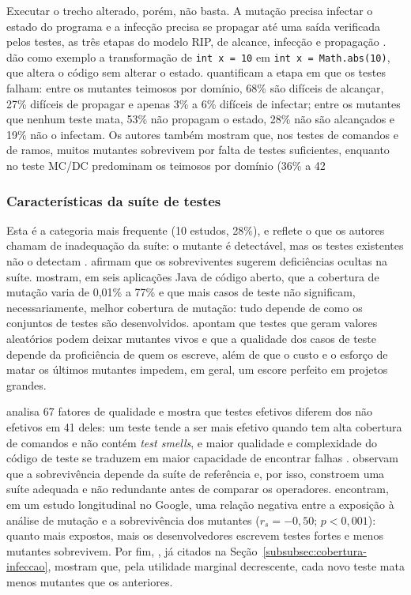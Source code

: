 Executar o trecho alterado, porém, não basta. A mutação precisa infectar o estado do programa e a infecção precisa se propagar até uma saída verificada pelos testes, as três etapas do modelo RIP, de alcance, infecção e propagação \cite{yao2014, lin2018}.  dão como exemplo a transformação de \texttt{int x = 10} em \texttt{int x = Math.abs(10)}, que altera o código sem alterar o estado.  quantificam a etapa em que os testes falham: entre os mutantes teimosos por domínio, 68\% são difíceis de alcançar, 27\% difíceis de propagar e apenas 3\% a 6\% difíceis de infectar; entre os mutantes que nenhum teste mata, 53\% não propagam o estado, 28\% não são alcançados e 19\% não o infectam. Os autores também mostram que, nos testes de comandos e de ramos, muitos mutantes sobrevivem por falta de testes suficientes, enquanto no teste MC/DC predominam os teimosos por domínio (36\% a 42%

\subsubsection{Características da suíte de testes}
\label{subsubsec:caracteristicas-suite}

Esta é a categoria mais frequente (10 estudos, 28\%), e reflete o que os autores chamam de inadequação da suíte: o mutante é detectável, mas os testes existentes não o detectam \cite{inozemtseva2013}.  afirmam que os sobreviventes sugerem deficiências ocultas na suíte.  mostram, em seis aplicações Java de código aberto, que a cobertura de mutação varia de 0,01\% a 77\% e que mais casos de teste não significam, necessariamente, melhor cobertura de mutação: tudo depende de como os conjuntos de testes são desenvolvidos.  apontam que testes que geram valores aleatórios podem deixar mutantes vivos e que a qualidade dos casos de teste depende da proficiência de quem os escreve, além de que o custo e o esforço de matar os últimos mutantes impedem, em geral, um escore perfeito em projetos grandes.

 analisa 67 fatores de qualidade e mostra que testes efetivos diferem dos não efetivos em 41 deles: um teste tende a ser mais efetivo quando tem alta cobertura de comandos e não contém \textit{test smells}, e maior qualidade e complexidade do código de teste se traduzem em maior capacidade de encontrar falhas \cite{grano2019}.  observam que a sobrevivência depende da suíte de referência e, por isso, constroem uma suíte adequada e não redundante antes de comparar os operadores.  encontram, em um estudo longitudinal no Google, uma relação negativa entre a exposição à análise de mutação e a sobrevivência dos mutantes ($r_s = -0,50$; $p < 0,001$): quanto mais expostos, mais os desenvolvedores escrevem testes fortes e menos mutantes sobrevivem. Por fim, , já citados na Seção~\ref{subsubsec:cobertura-infeccao}, mostram que, pela utilidade marginal decrescente, cada novo teste mata menos mutantes que os anteriores.

